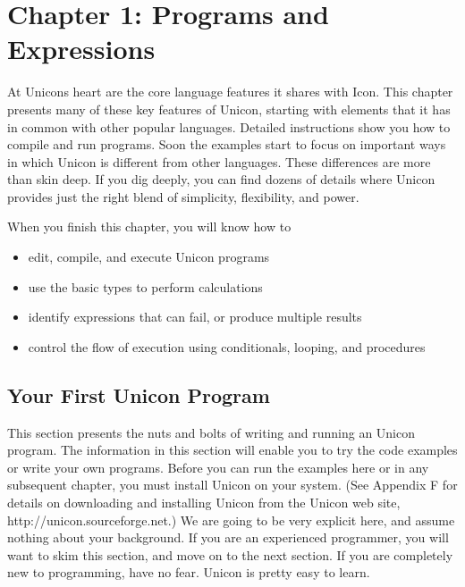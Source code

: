 \clearpage
\section{Chapter 1: Programs and Expressions}

At Unicon{\textquotesingle}s heart are the core language features it
shares with Icon. This chapter presents many of these key features of
Unicon, starting with elements that it has in common with other popular
languages. Detailed instructions show you how to compile
and run programs. Soon the examples start to focus on
important ways in which Unicon is different from other languages. These
differences are more than skin deep. If you dig deeply, you can find
dozens of details where Unicon provides just the right blend of
simplicity, flexibility, and power.

When you finish this chapter, you will know how to

\begin{itemize}
\item edit, compile, and execute Unicon programs
\item use the basic types to perform calculations
\item identify expressions that can fail, or
produce multiple results
\item control the flow of execution using conditionals, looping, and
procedures
\end{itemize}

\subsection{Your First Unicon Program}

This section presents the nuts and bolts of writing and running an
Unicon program. The information in this section will enable you to try
the code examples or write your own programs. Before you can run the
examples here or in any subsequent chapter, you must
install Unicon on your system. (See Appendix F for
details on downloading and installing Unicon from the Unicon web site,
http://unicon.sourceforge.net.) We are going to be very explicit here,
and assume nothing about your background. If you are an experienced
programmer, you will want to skim this section, and move on to the next
section. If you are completely new to programming, have no fear. Unicon
is pretty easy to learn.

